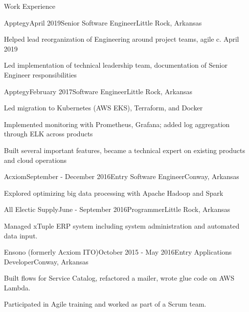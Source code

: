 \documentclass{resume} %
\begin{document}
\begin{rSection}{Work Experience}

\begin{rSubsection}{Apptegy}{April 2019}{Senior Software Engineer}{Little Rock, Arkansas}
	\item Helped lead reorganization of Engineering around project teams, agile c. April 2019
	\item Led implementation of technical leadership team, documentation of Senior Engineer responsibilities
\end{rSubsection}

\begin{rSubsection}{Apptegy}{February 2017}{Software Engineer}{Little Rock, Arkansas}
	\item Led migration to Kubernetes (AWS EKS), Terraform, and Docker
	\item Implemented monitoring with Prometheus, Grafana; added log aggregation through ELK across products
	\item Built several important features, became a technical expert on existing products and cloud operations
\end{rSubsection}

\begin{rSubsection}{Acxiom}{September - December 2016}{Entry Software Engineer}{Conway, Arkansas}
	\item Explored optimizing big data processing with Apache Hadoop and Spark
\end{rSubsection}


\begin{rSubsection}{All Electic Supply}{June - September 2016}{Programmer}{Little Rock, Arkansas}
	\item Managed xTuple ERP system including system administration and automated data input.
\end{rSubsection}

\begin{rSubsection}{Ensono (formerly Acxiom ITO)}{October 2015 - May 2016}{Entry Applications Developer}{Conway, Arkansas}
	\item Built flows for Service Catalog, refactored a mailer, wrote glue code on AWS Lambda.
	\item Participated in Agile training and worked as part of a Scrum team.
\end{rSubsection}



\end{rSection}
\end{document}
